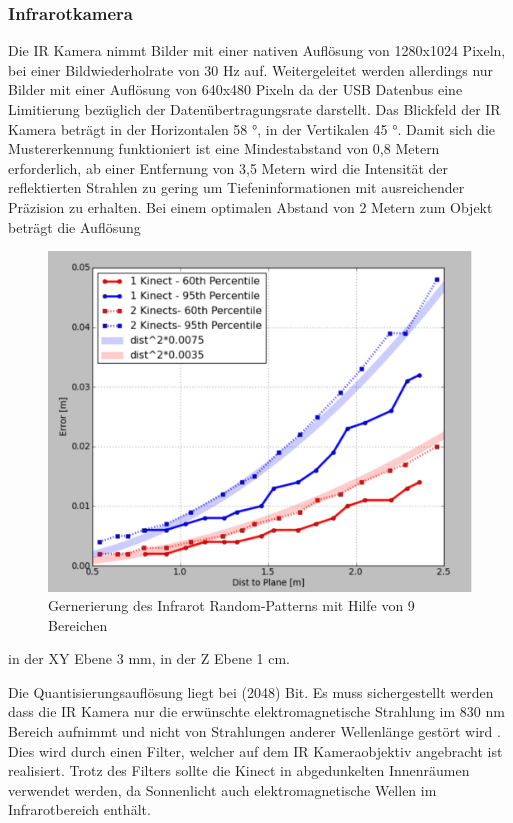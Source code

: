 \subsubsection{Infrarotkamera}
Die IR Kamera nimmt Bilder mit einer nativen Auflösung von 1280x1024 Pixeln, bei einer Bildwiederholrate von 30 Hz auf. Weitergeleitet werden allerdings nur Bilder mit einer Auflösung von 640x480 Pixeln da der USB Datenbus eine Limitierung bezüglich der Datenübertragungsrate darstellt. Das Blickfeld der IR Kamera beträgt in der Horizontalen 58 °, in der Vertikalen 45 °. Damit sich die Mustererkennung funktioniert ist eine Mindestabstand von 0,8 Metern erforderlich, ab einer Entfernung von 3,5 Metern wird die Intensität der reflektierten Strahlen zu gering um Tiefeninformationen mit ausreichender Präzision zu erhalten.
Bei einem optimalen Abstand von 2 Metern zum Objekt beträgt die Auflösung 
\begin{figure}
\centering
\includegraphics[width=0.7\linewidth]{./Res/Res_to_Dist}
\caption{Gernerierung des Infrarot Random-Patterns mit Hilfe von 9 Bereichen}
\label{fig:Res_to_Dist}
\end{figure}

in der XY Ebene 3 mm, in der Z Ebene 1 cm.

Die Quantisierungsauflösung liegt bei  (2048) Bit.
Es muss sichergestellt werden dass die IR Kamera nur die erwünschte elektromagnetische Strahlung im 830 nm Bereich aufnimmt und nicht von Strahlungen anderer Wellenlänge gestört wird . Dies wird durch einen Filter, welcher auf dem IR Kameraobjektiv angebracht ist realisiert.
Trotz des Filters sollte die Kinect in abgedunkelten Innenräumen verwendet werden, da  Sonnenlicht auch elektromagnetische Wellen im Infrarotbereich enthält.

